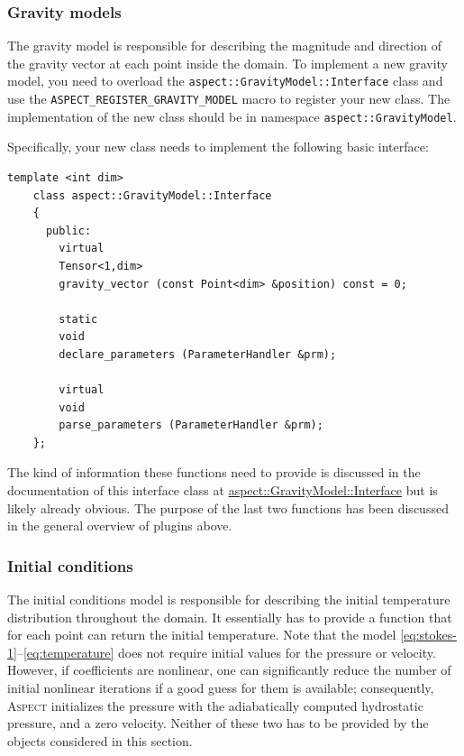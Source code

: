 \documentclass{article}
\newcommand{\aspect}{\textsc{Aspect}}
\begin{document}
\subsubsection{Gravity models}
\label{sec:gravity-models}

The gravity model is responsible for describing the magnitude and direction of
the gravity vector at each point inside the domain. To implement a new gravity model, you
need to overload the \texttt{aspect::GravityModel::Interface} class and use
the \texttt{ASPECT\_REGISTER\_GRAVITY\_MODEL} macro to register your new
class. The implementation of the new class should be in namespace
\texttt{aspect::GravityModel}.

Specifically, your new class needs to implement the following basic interface:
\begin{lstlisting}[frame=single]
    template <int dim>
    class aspect::GravityModel::Interface
    {
      public:
        virtual
        Tensor<1,dim>
        gravity_vector (const Point<dim> &position) const = 0;

        static
        void
        declare_parameters (ParameterHandler &prm);

        virtual
        void
        parse_parameters (ParameterHandler &prm);
    };
\end{lstlisting}
The kind of information these functions need to provide is discussed in the
documentation of this interface class at
\href{doc/doxygen/classaspect_1_1GravityModel_1_1Interface.html}{aspect::GravityModel::Interface}
but is likely already obvious. The purpose of the last two functions has been
discussed in the general overview of plugins above.


\subsubsection{Initial conditions}
\label{sec:initial-conditions}

The initial conditions model is responsible for describing the initial
temperature distribution throughout the domain. It essentially has to provide
a function that for each point can return the initial temperature. Note that
the model \eqref{eq:stokes-1}--\eqref{eq:temperature} does not require initial
values for the pressure or velocity. However, if coefficients are nonlinear,
one can significantly reduce the number of initial nonlinear iterations if a
good guess for them is available; consequently, \aspect{} initializes the
pressure with the adiabatically computed hydrostatic pressure, and a zero
velocity. Neither of these two has to be provided by the objects considered in
this section.
\end{document}
